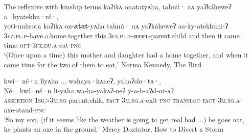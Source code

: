 \documentclass[output=paper]{langscibook}
\begin{document}
 

    \label{ex:oneida:14}
   The reflexive with kinship terms
    \ea 
    \label{ex:oneida:14a}
     {kaʔikʌ} {onatatyʌha,} {tahnú·} {nʌ} {yaʔkáheweʔ} {a·kyatekhu·ní·,}\\
     yoti-nuhsota  {kaʔikʌ} on-\textbf{atat}-yʌha {tahnú·} {nʌ}    {yaʔkáheweʔ}   aa-ky-atekhuni-ʔ\\
   \textsc{3fz.pl.p-}have.a.home.together  this    \textsc{3fz.pl.p-}\textbf{\textsc{refl}}-parent:child and    then  it came time  \textsc{opt-3fz.du.a-}eat\textsc{-pnc}\\
  \glt  ‘(Once upon a time) this mother and daughter had a home together, and when it       came time for the two of them to eat,’ Norma Kennedy, {The} {Bird}
    
 \ex  
 \label{ex:oneida:14b}
  {kwí·} {né·n}   {liyʌha} ...        {wahaya·kʌneʔ,} {yahaʔslo·tʌ·,}\\
   Né· kwí·né·n li-yʌha wa-ha-yakʌʔ-neʔ y-a-h-aʔsl-ot-ʌʔ\\
  \textsc{assertion}    \textsc{1sg>3m.sg}-parent:child  \textsc{fact-3m.sg.a-}exit\textsc{-pnc} \textsc{transloc-fact-3m.sg.a-}axe-stand\textsc{-pnc} \\
  \glt ‘So my son, (if it seems like the weather is going to get real bad ...) he goes out, he plants an axe in the ground,’ Mercy Doxtator, {How} {to} {Divert} {a} {Storm}
  \z
 \z
\end{document}

